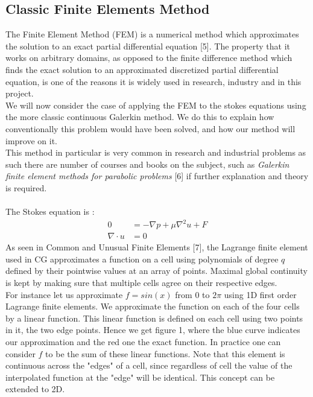\documentclass[11pt,twoside,a4paper]{article}
\begin{document}
\subsection{Classic Finite Elements Method}
The Finite Element Method (FEM) is a numerical method which approximates the solution to an exact partial differential equation [5]. The property that it works on arbitrary domains, as opposed to the finite difference method which finds the exact solution to an approximated discretized partial differential equation, is one of the reasons it is widely used in research, industry and in this project.\\
We will now consider the case of applying the FEM to the stokes equations using the more classic continuous Galerkin method. We do this to explain how conventionally this problem would have been solved, and how our method will improve on it.\\
This method in particular is very common in research and industrial problems as such there are number of courses and books on the subject, such as \textit{Galerkin finite element methods for parabolic problems} [6] if further explanation and theory is required.\\
\\
The Stokes equation is :
\begin{align}
0 &= -\nabla p + \mu \nabla^2 u + F \\
\nabla \cdot u &= 0
\end{align}
As seen in Common and Unusual Finite Elements [7], the Lagrange finite element used in CG approximates a function on a cell using polynomials of degree $q$ defined by their pointwise values at an array of points. Maximal global continuity is kept by making sure  that multiple cells agree on their respective edges.\\
For instance let us approximate $f = sin(x)$ from $0$ to $2 \pi$ using 1D first order Lagrange finite elements. We approximate the function on each of the four cells by a linear function. This linear function is defined on each cell using two points in it, the two edge points. Hence we get figure 1, where the blue curve indicates our approximation and the red one the exact function. In practice one can consider $f$ to be the sum of these linear functions. Note that this element is continuous across the "edges" of a cell, since regardless of cell the value of the interpolated function at the "edge" will be identical. This concept can be extended to 2D.\\
\end{document}
